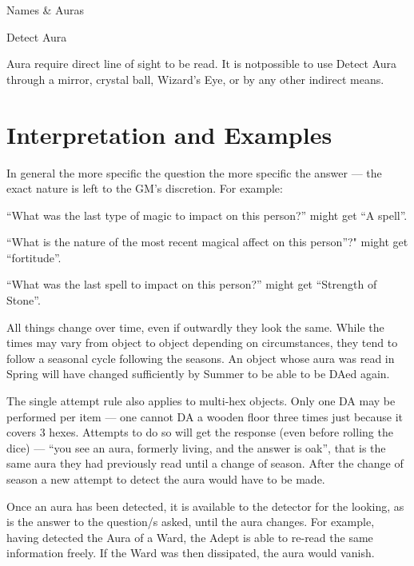 \begin{Chapter}{Names \& Auras}
\begin{talent}{Detect Aura}
\begin{effects}
Aura require direct line of sight to be read. It is notpossible to use
Detect Aura through a mirror, crystal ball, Wizard’s Eye, or by any
other indirect means.
\end{effects}
\end{talent}

\section{Interpretation and Examples}

\begin{Enumerate}
\item In general the more specific the question the more specific the
  answer — the exact nature is left to the GM’s discretion. For
  example:
  \begin{Itemize}
  \item “What was the last type of magic to impact on this person?”
    might get “A spell”.

  \item “What is the nature of the most recent magical affect on this
    person”?" might get “fortitude”.

  \item “What was the last spell to impact on this person?” might
    get “Strength of Stone”.
  \end{Itemize}

\item All things change over time, even if outwardly they look the
  same. While the times may vary from object to object depending on
  circumstances, they tend to follow a seasonal cycle following the
  seasons.  An object whose aura was read in Spring will have changed
  sufficiently by Summer to be able to be DAed again.

\item The single attempt rule also applies to multi-hex objects.  Only
  one DA may be performed per item — one cannot DA a wooden floor
  three times just because it covers 3 hexes.  Attempts to do so will
  get the response (even before rolling the dice) --- “you see an
  aura, formerly living, and the answer is oak”, that is the same aura
  they had previously read until a change of season.  After the change
  of season a new attempt to detect the aura would have to be made.

\item Once an aura has been detected, it is available to the detector
  for the looking, as is the answer to the question/s asked, until the
  aura changes. For example, having detected the Aura of a Ward, the
  Adept is able to re-read the same information freely. If the Ward
  was then dissipated, the aura would vanish.


\end{Enumerate}
\end{Chapter}
